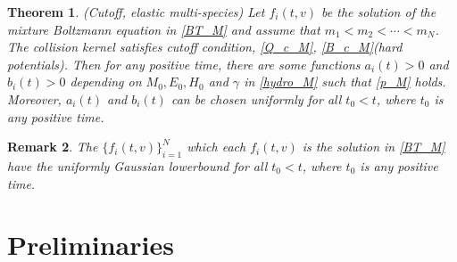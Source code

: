 \documentclass[reqno,10pt]{amsart}
\newtheorem{theorem}{Theorem}[section]
\newtheorem{remark}[theorem]{Remark}
\numberwithin{equation}{section}
\begin{document}
\begin{theorem} (Cutoff, elastic multi-species) \label{1.3}
Let $f_i(t,v)$ be the solution of the mixture Boltzmann equation in \eqref{BT_M} and assume that $m_1<m_2< \cdots <m_N$. The collision kernel satisfies cutoff condition, \eqref{Q_c_M}, \eqref{B_c_M}(hard potentials). Then for any positive time, there are some functions $a_i(t)>0$ and $b_i(t)>0$ depending on $M_0,E_0,H_0$ and $\gamma$ in \eqref{hydro_M} such that \eqref{p_M} holds. Moreover, $a_i(t)$ and $b_i(t)$ can be chosen uniformly for all $t_0<t$, where $t_0$ is any positive time. \\
\end{theorem}

\begin{remark}
The $\{f_i(t,v)\}_{i=1}^{N}$ which each $f_i(t,v)$ is the solution in \eqref{BT_M} have the uniformly Gaussian lowerbound for all $t_0<t$, where $t_0$ is any positive time.  \\
\end{remark}  

\section{Preliminaries}
\end{document}
